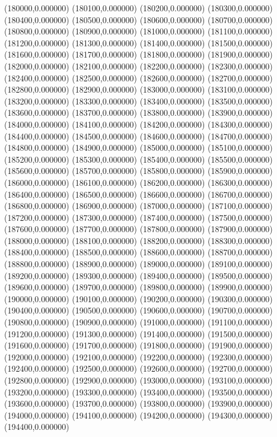(180000,0.000000)
(180100,0.000000)
(180200,0.000000)
(180300,0.000000)
(180400,0.000000)
(180500,0.000000)
(180600,0.000000)
(180700,0.000000)
(180800,0.000000)
(180900,0.000000)
(181000,0.000000)
(181100,0.000000)
(181200,0.000000)
(181300,0.000000)
(181400,0.000000)
(181500,0.000000)
(181600,0.000000)
(181700,0.000000)
(181800,0.000000)
(181900,0.000000)
(182000,0.000000)
(182100,0.000000)
(182200,0.000000)
(182300,0.000000)
(182400,0.000000)
(182500,0.000000)
(182600,0.000000)
(182700,0.000000)
(182800,0.000000)
(182900,0.000000)
(183000,0.000000)
(183100,0.000000)
(183200,0.000000)
(183300,0.000000)
(183400,0.000000)
(183500,0.000000)
(183600,0.000000)
(183700,0.000000)
(183800,0.000000)
(183900,0.000000)
(184000,0.000000)
(184100,0.000000)
(184200,0.000000)
(184300,0.000000)
(184400,0.000000)
(184500,0.000000)
(184600,0.000000)
(184700,0.000000)
(184800,0.000000)
(184900,0.000000)
(185000,0.000000)
(185100,0.000000)
(185200,0.000000)
(185300,0.000000)
(185400,0.000000)
(185500,0.000000)
(185600,0.000000)
(185700,0.000000)
(185800,0.000000)
(185900,0.000000)
(186000,0.000000)
(186100,0.000000)
(186200,0.000000)
(186300,0.000000)
(186400,0.000000)
(186500,0.000000)
(186600,0.000000)
(186700,0.000000)
(186800,0.000000)
(186900,0.000000)
(187000,0.000000)
(187100,0.000000)
(187200,0.000000)
(187300,0.000000)
(187400,0.000000)
(187500,0.000000)
(187600,0.000000)
(187700,0.000000)
(187800,0.000000)
(187900,0.000000)
(188000,0.000000)
(188100,0.000000)
(188200,0.000000)
(188300,0.000000)
(188400,0.000000)
(188500,0.000000)
(188600,0.000000)
(188700,0.000000)
(188800,0.000000)
(188900,0.000000)
(189000,0.000000)
(189100,0.000000)
(189200,0.000000)
(189300,0.000000)
(189400,0.000000)
(189500,0.000000)
(189600,0.000000)
(189700,0.000000)
(189800,0.000000)
(189900,0.000000)
(190000,0.000000)
(190100,0.000000)
(190200,0.000000)
(190300,0.000000)
(190400,0.000000)
(190500,0.000000)
(190600,0.000000)
(190700,0.000000)
(190800,0.000000)
(190900,0.000000)
(191000,0.000000)
(191100,0.000000)
(191200,0.000000)
(191300,0.000000)
(191400,0.000000)
(191500,0.000000)
(191600,0.000000)
(191700,0.000000)
(191800,0.000000)
(191900,0.000000)
(192000,0.000000)
(192100,0.000000)
(192200,0.000000)
(192300,0.000000)
(192400,0.000000)
(192500,0.000000)
(192600,0.000000)
(192700,0.000000)
(192800,0.000000)
(192900,0.000000)
(193000,0.000000)
(193100,0.000000)
(193200,0.000000)
(193300,0.000000)
(193400,0.000000)
(193500,0.000000)
(193600,0.000000)
(193700,0.000000)
(193800,0.000000)
(193900,0.000000)
(194000,0.000000)
(194100,0.000000)
(194200,0.000000)
(194300,0.000000)
(194400,0.000000)
